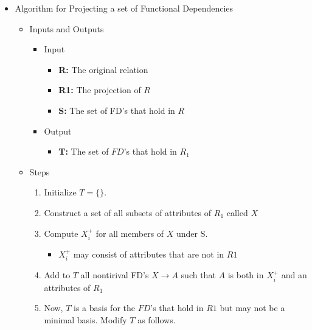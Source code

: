\documentclass[12pt]{article}
\begin{document}
\begin{enumerate}[1.]
\begin{enumerate}[a)]
\begin{itemize}
            \item Algorithm for Projecting a set of Functional Dependencies
            \begin{itemize}
                \item Inputs and Outputs
                \begin{itemize}
                    \item Input
                    \begin{itemize}
                        \item \textbf{R:} The original relation
                        \item \textbf{R1:} The projection of $R$
                        \item \textbf{S:} The set of FD's that hold in $R$
                    \end{itemize}
                    \item Output
                    \begin{itemize}
                        \item \textbf{T:} The set of $FD$'s that hold in $R_1$
                    \end{itemize}
                \end{itemize}

                \item Steps
                \begin{enumerate}[1.]
                    \item Initialize $T = \{\}$.
                    \item Construct a set of all subsets of attributes of $R_1$ called $X$
                    \item Compute $X_i^+$ for all members of $X$ under S.
                    \begin{itemize}
                        \item $X_i^+$ may consist of attributes that are not in $R1$
                    \end{itemize}
                    \item Add to $T$ all nontirival FD's $X \to A$ such that $A$
                    is both in $X_i^+$ and an attributes of $R_1$
                    \item Now, $T$ is a basis for the $FD$'s that hold in $R1$ but
                    may not be a minimal basis. Modify $T$ as follows.


\end{enumerate}
\end{itemize}
\end{itemize}
\end{enumerate}
\end{enumerate}
\end{document}
